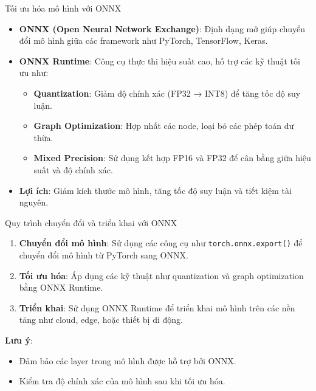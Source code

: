 \documentclass{beamer}
\begin{document}
\begin{frame}{Tối ưu hóa mô hình với ONNX}
    \begin{itemize}
        \item \textbf{ONNX (Open Neural Network Exchange)}: Định dạng mở giúp chuyển đổi mô hình giữa các framework như PyTorch, TensorFlow, Keras.
        \item \textbf{ONNX Runtime}: Công cụ thực thi hiệu suất cao, hỗ trợ các kỹ thuật tối ưu như:
        \begin{itemize}
            \item \textbf{Quantization}: Giảm độ chính xác (FP32 → INT8) để tăng tốc độ suy luận.
            \item \textbf{Graph Optimization}: Hợp nhất các node, loại bỏ các phép toán dư thừa.
            \item \textbf{Mixed Precision}: Sử dụng kết hợp FP16 và FP32 để cân bằng giữa hiệu suất và độ chính xác.
        \end{itemize}
        \item \textbf{Lợi ích}: Giảm kích thước mô hình, tăng tốc độ suy luận và tiết kiệm tài nguyên.
    \end{itemize}
\end{frame}
    
\begin{frame}{Quy trình chuyển đổi và triển khai với ONNX}
    \begin{enumerate}
        \item \textbf{Chuyển đổi mô hình}: Sử dụng các công cụ như \texttt{torch.onnx.export()} để chuyển đổi mô hình từ PyTorch sang ONNX.
        \item \textbf{Tối ưu hóa}: Áp dụng các kỹ thuật như quantization và graph optimization bằng ONNX Runtime.
        \item \textbf{Triển khai}: Sử dụng ONNX Runtime để triển khai mô hình trên các nền tảng như cloud, edge, hoặc thiết bị di động.
    \end{enumerate}
    \textbf{Lưu ý}:
    \begin{itemize}
        \item Đảm bảo các layer trong mô hình được hỗ trợ bởi ONNX.
        \item Kiểm tra độ chính xác của mô hình sau khi tối ưu hóa.
    \end{itemize}
\end{frame}
\end{document}
